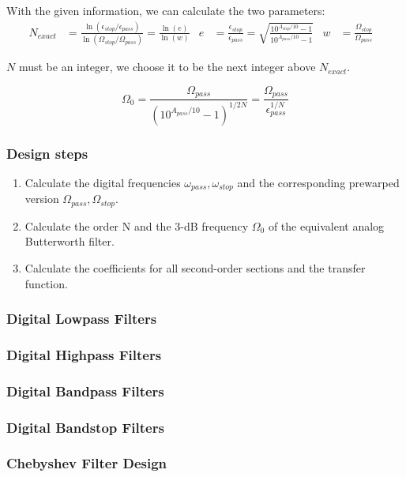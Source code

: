 With the given information, we can calculate the two parameters:
\begin{align*}
	N_{exact} &= \frac{
			\ln(\epsilon_{stop} / \epsilon_{pass})
		}{
			\ln(\Omega_{stop} / \Omega_{pass})
		}
	= \frac{\ln(e)}{\ln(w)} &	
	e &= \frac{\epsilon_{stop}}{\epsilon_{pass}}
	   = \sqrt{\frac{10^{A_{stop}/10} -1}{10^{A_{pass}/10} -1}}&
	w &= \frac{\Omega_{stop}}{\Omega_{pass}}&	
\end{align*}

$N$ must be an integer, we choose it to be the next integer above $N_{exact}$.

\[
	\Omega_0 = \frac{
			\Omega_{pass}
		}{
			\left(10^{A_{pass}/10}-1\right)^{1/2N}
		} = \frac{
			\Omega_{pass}
		}{
			\epsilon_{pass}^{1/N}
		}
\]
\subsubsection{Design steps}
\begin{enumerate}
	\item Calculate the digital frequencies ${\omega_{pass}, \omega_{stop}}$ and the corresponding prewarped version ${\Omega_{pass}, \Omega_{stop}}$.
	\item Calculate the order N and the 3-dB frequency $\Omega_0$ of the equivalent analog Butterworth filter.
	\item Calculate the coefficients for all second-order sections and the transfer function.
\end{enumerate}

\subsubsection{Digital Lowpass Filters}

\subsubsection{Digital Highpass Filters}
\subsubsection{Digital Bandpass Filters}
\subsubsection{Digital Bandstop Filters}
\subsubsection{Chebyshev Filter Design}
